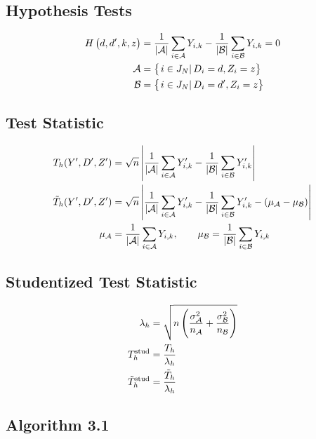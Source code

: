 \documentclass[10pt]{article}
\begin{document}
	\subsection{Hypothesis Tests}

	\begin{align*}
		\hypTest{d,d^\prime,k,z} &= \frac{1}{\wrapAbs{\mathcal{A}}}\sum_{i\in\mathcal{A}} Y_{i,k} - \frac{1}{\wrapAbs{\mathcal{B}}}\sum_{i\in\mathcal{B}} Y_{i,k} = 0 \\
		\mathcal{A} &= \set{i\in J_N}{D_i=d, Z_i=z} \\
		\mathcal{B} &= \set{i\in J_N}{D_i=d^\prime, Z_i=z}
	\end{align*}

	\subsection{Test Statistic}

	\begin{align*}
		T_h(Y^{\prime},D^{\prime},Z^{\prime}) &= \sqrt{n}\wrapAbs{\frac{1}{\wrapAbs{\mathcal{A}}}\sum_{i\in\mathcal{A}} Y^{\prime}_{i,k} - \frac{1}{\wrapAbs{\mathcal{B}}}\sum_{i\in\mathcal{B}} Y^{\prime}_{i,k}} \\	
		\tilde{T}_h(Y^{\prime},D^{\prime},Z^{\prime}) &= \sqrt{n}\wrapAbs{\frac{1}{\wrapAbs{\mathcal{A}}}\sum_{i\in\mathcal{A}} Y^{\prime}_{i,k} - \frac{1}{\wrapAbs{\mathcal{B}}}\sum_{i\in\mathcal{B}} Y^{\prime}_{i,k} - \del{\mu_{\mathcal{A}}-\mu_{\mathcal{B}}} } \\	
		\mu_{\mathcal{A}} &= \frac{1}{\wrapAbs{\mathcal{A}}}\sum_{i\in\mathcal{A}} Y_{i,k}, \qquad \mu_{\mathcal{B}} = \frac{1}{\wrapAbs{\mathcal{B}}}\sum_{i\in\mathcal{B}} Y_{i,k}
	\end{align*}

	\subsection{Studentized Test Statistic}

	\begin{align*}
		\lambda_h &= \sqrt{n \del{\frac{\sigma^2_{\mathcal{A}}}{n_{\mathcal{A}}} + \frac{\sigma^2_{\mathcal{B}}}{n_{\mathcal{B}}} }} \\
		T^{\text{stud}}_h &= \frac{T_h}{\lambda_h} \\
		\tilde{T}^{\text{stud}}_h &= \frac{\tilde{T}_h}{\lambda_h}		
	\end{align*}

	\subsection{Algorithm 3.1}
\end{document}
